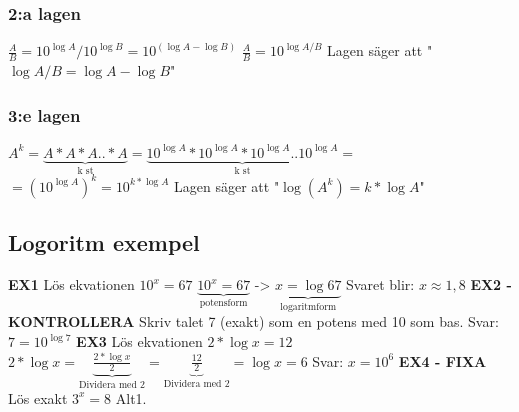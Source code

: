 \documentclass[a4paper,11pt]{article}
\begin{document}
\begin{flushleft}
\subsubsection{2:a lagen}
$\frac{A}{B} = 10^{\log{A}}/10^{\log{B}} = 10^{(\log{A}-\log{B})}$\newline
$\frac{A}{B} = 10^{\log{A/B}} $ \newline
Lagen säger att "$\log{A/B} = \log{A}-\log{B} $"
\subsubsection{3:e lagen}
$A^k = \underbrace{A*A*A..*A}_{\text{k st}} = \underbrace{10^{\log{A}}*10^{\log{A}}*10^{\log{A}}..10^{\log{A}}}_{\text{k st}} = $\newline
$= (10^{\log{A}})^k = 10^{k*\log{A}}$\newline\newline
Lagen säger att "$\log(A^k) = k*\log{A} $"

\subsection{Logoritm exempel}
\textbf{EX1}\newline
Lös ekvationen $ 10^x = 67 $\newline\newline
$ \underbrace{10^x = 67}_{\text{potensform}} $ -> $ \underbrace{x=\log{67}}_{\text{logaritmform}} $\newline
Svaret blir: $ x \approx 1,8 $
\newline\newline
\textbf{EX2 - KONTROLLERA}\newline
Skriv talet 7 (exakt) som en potens med 10 som bas.\newline\newline
Svar: $ 7 = 10^{\log{7}} $
\newline\newline
\textbf{EX3}\newline
Lös ekvationen $ 2*\log{x}=12 $\newline\newline
$ 2*\log{x} = \underbrace{\frac{2*\log{x}}{2}}_{\text{Dividera med 2}} = \underbrace{\frac{12}{2}}_{\text{Dividera med 2}} = \log{x}=6 $ \newline\newline\newline
Svar: $ x = 10^6$
\newline\newline
\textbf{EX4 - FIXA}\newline
Lös exakt $ 3^x = 8 $\newline\newline
Alt1.\newline


\end{flushleft}
\end{document}
